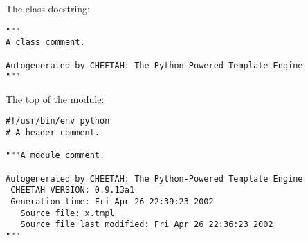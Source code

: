 The class docstring:
\begin{verbatim}
"""
A class comment.

Autogenerated by CHEETAH: The Python-Powered Template Engine
"""
\end{verbatim}

The top of the module:
\begin{verbatim}
#!/usr/bin/env python
# A header comment.

"""A module comment.

Autogenerated by CHEETAH: The Python-Powered Template Engine
 CHEETAH VERSION: 0.9.13a1
 Generation time: Fri Apr 26 22:39:23 2002
   Source file: x.tmpl
   Source file last modified: Fri Apr 26 22:36:23 2002
"""
\end{verbatim}


